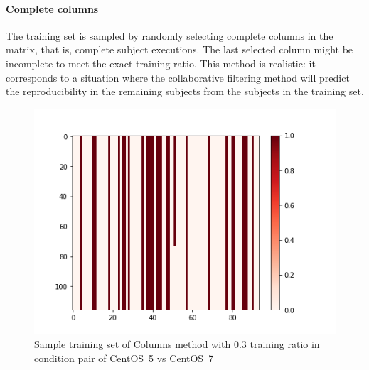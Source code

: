 \documentclass[10pt, conference, compsocconf]{IEEEtran}
\begin{document}
\paragraph{Complete columns}
The training set is sampled by randomly selecting complete columns in
the matrix, that is, complete subject executions. The last selected
column might be incomplete to meet the exact training ratio. This
method is realistic: it corresponds to a situation where the
collaborative filtering method will predict the reproducibility in the
remaining subjects from the subjects in the training set.
\begin{figure}
  \includegraphics[width=\columnwidth]{figures/5vs7_columns_03_training_plot}
  \caption{Sample training set of Columns method with 0.3 training ratio in condition pair of CentOS~5 vs CentOS~7}
  \label{fig:Sample Training set }
\end{figure}
\end{document}
